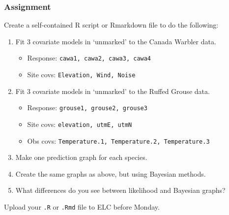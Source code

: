 \documentclass[color=usenames,dvipsnames]{beamer}\usepackage[]{graphicx}\usepackage[]{color}
\begin{document}
\begin{frame}
  \frametitle{Assignment}
  \footnotesize
  Create a self-contained R script or Rmarkdown file
  to do the following:
  \vfill
  \begin{enumerate}
    \footnotesize
    \item Fit 3 covariate models in `unmarked' to the Canada Warbler data. 
      \begin{itemize}
        \footnotesize
        \item Response: \texttt{cawa1, cawa2, cawa3, cawa4}
        \item Site covs: \texttt{Elevation, Wind, Noise}
      \end{itemize}
    \item Fit 3 covariate models in `unmarked' to the Ruffed Grouse data. 
      \begin{itemize}
        \footnotesize
        \item Response: \texttt{grouse1, grouse2, grouse3}
        \item Site covs: \texttt{elevation, utmE, utmN}
        \item Obs covs: \texttt{Temperature.1, Temperature.2, Temperature.3}
      \end{itemize}
    \item Make one prediction graph for each species. 
    \item Create the same graphs as above, but using Bayesian methods.
    \item What differences do you see between likelihood and Bayesian graphs?
    \end{enumerate}
    \vfill
    Upload your {\tt .R} or {\tt .Rmd} file to ELC before Monday. 
\end{frame}
\end{document}
